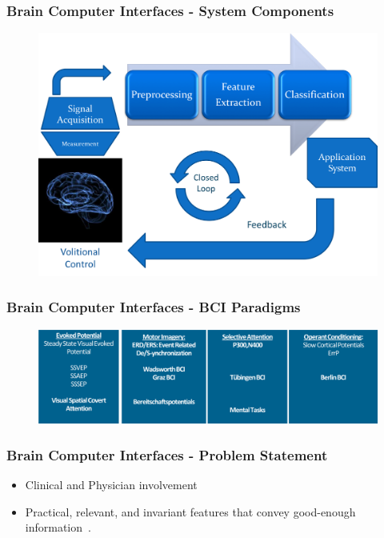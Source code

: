 \documentclass[aspectratio=169]{beamer}
\begin{document}
\begin{frame}
\frametitle{Brain Computer Interfaces - System Components}
\begin{center}
\begin{figure}[]
\centering
\includegraphics[scale=0.4]{images/bcichart.png}
\label{fig:bciblockdiagram}
\end{figure}
\end{center}
\end{frame}

\begin{frame}   
\frametitle{Brain Computer Interfaces - BCI Paradigms}
\begin{figure}[]
\centering
\includegraphics[scale=0.5]{images/BCIParadigms.png}
\label{fig:digitalelectroencephalograph}
\end{figure}
\end{frame}   
    

    \begin{frame}
        \frametitle{Brain Computer Interfaces - Problem Statement}
        \begin{center}
            \begin{itemize}
                \item<1-> Clinical and Physician involvement~
                \item<2-> Practical, relevant, and invariant features that convey good-enough information~.
            \end{itemize}
        \end{center}
    \end{frame} 
    
\end{document}
